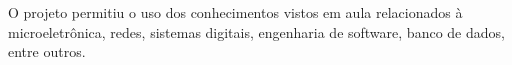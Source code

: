 \label{Cap:consideracoes_finais}

O projeto permitiu o uso dos conhecimentos vistos em aula relacionados à microeletrônica, redes, sistemas digitais, engenharia de software, banco de dados, entre outros.